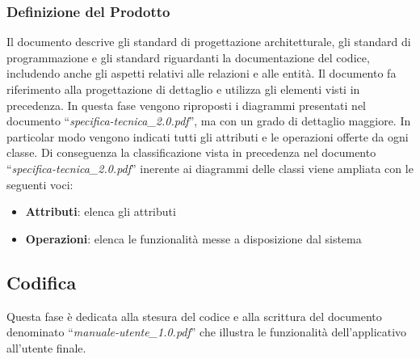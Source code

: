 \documentclass[a4paper,11pt]{article}
\begin{document}
\subsubsection{Definizione del Prodotto}
Il documento descrive gli standard di progettazione architetturale, gli standard di programmazione e gli standard riguardanti la documentazione del codice, includendo anche gli aspetti relativi alle relazioni e alle entit\`a. Il documento fa riferimento alla progettazione di dettaglio e utilizza gli elementi visti in precedenza. In questa fase vengono riproposti i diagrammi presentati nel documento ``\textit{specifica-tecnica\_2.0.pdf}'', ma con un grado di dettaglio maggiore. In particolar modo vengono indicati tutti gli attributi e le operazioni offerte da ogni classe. Di conseguenza la classificazione vista in precedenza nel documento ``\textit{specifica-tecnica\_2.0.pdf}'' inerente ai diagrammi delle classi viene ampliata con le seguenti voci: 
\begin{itemize}
\item \textbf{Attributi}: elenca gli attributi
\item \textbf{Operazioni}: elenca le funzionalit\`a messe a disposizione dal sistema
\end{itemize}
\subsection{Codifica}
Questa fase \`e dedicata alla stesura del codice e alla scrittura del documento denominato ``\textit{manuale-utente\_1.0.pdf}'' che illustra le funzionalit\`a dell'applicativo all'utente finale.
\end{document}
